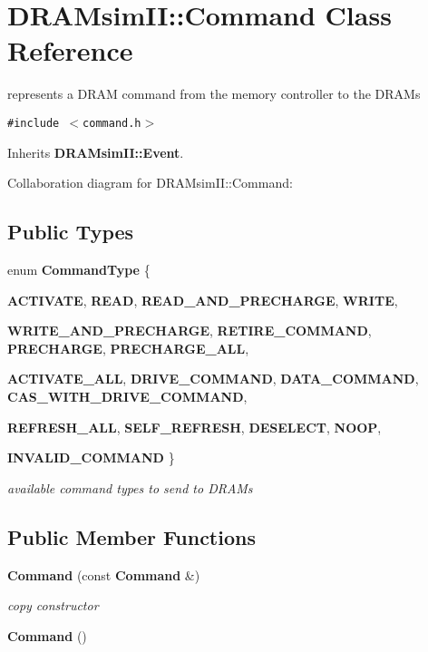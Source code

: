 \section{DRAMsimII::Command Class Reference}
\label{class_d_r_a_msim_i_i_1_1_command}
represents a DRAM command from the memory controller to the DRAMs  


{\tt \#include $<$command.h$>$}

Inherits {\bf DRAMsimII::Event}.

Collaboration diagram for DRAMsimII::Command:\subsection*{Public Types}
\begin{CompactItemize}
\item 
enum {\bf CommandType} \{ \par
{\bf ACTIVATE}, 
{\bf READ}, 
{\bf READ\_\-AND\_\-PRECHARGE}, 
{\bf WRITE}, 
\par
{\bf WRITE\_\-AND\_\-PRECHARGE}, 
{\bf RETIRE\_\-COMMAND}, 
{\bf PRECHARGE}, 
{\bf PRECHARGE\_\-ALL}, 
\par
{\bf ACTIVATE\_\-ALL}, 
{\bf DRIVE\_\-COMMAND}, 
{\bf DATA\_\-COMMAND}, 
{\bf CAS\_\-WITH\_\-DRIVE\_\-COMMAND}, 
\par
{\bf REFRESH\_\-ALL}, 
{\bf SELF\_\-REFRESH}, 
{\bf DESELECT}, 
{\bf NOOP}, 
\par
{\bf INVALID\_\-COMMAND}
 \}
\begin{CompactList}\small\item\em available command types to send to DRAMs \item\end{CompactList}\subsection*{Public Member Functions}
\begin{CompactItemize}
\item 
{\bf Command} (const {\bf Command} \&)\label{class_d_r_a_msim_i_i_1_1_command_73edafc4b38e3c5febe1270f1c6ef0d5}

\begin{CompactList}\small\item\em copy constructor \item\end{CompactList}\item 
{\bf Command} ()\label{class_d_r_a_msim_i_i_1_1_command_18df2d81039392daeb0b78c346a70537}


\end{CompactItemize}
\end{CompactItemize}
